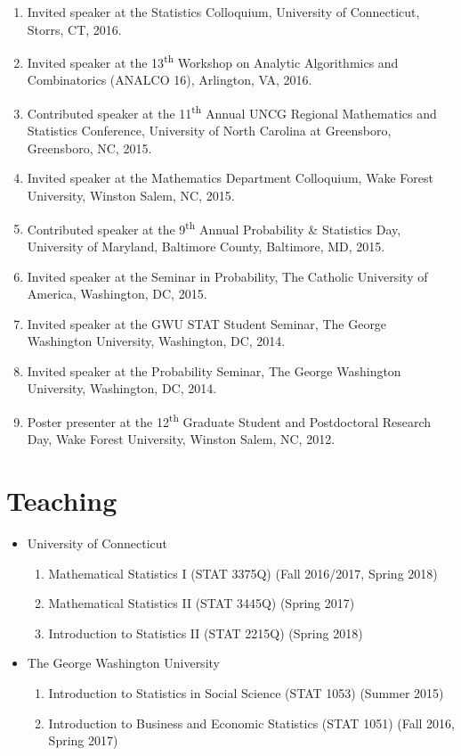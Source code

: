 \documentclass{res}
\begin{document}
\begin{resume}
\begin{enumerate}
	\item Invited speaker at the Statistics Colloquium, University of Connecticut, Storrs, CT, 2016.
	\item Invited speaker at the 13\textsuperscript{th} Workshop on Analytic Algorithmics and Combinatorics (ANALCO 16), Arlington, VA, 2016.
	\item Contributed speaker at the 11\textsuperscript{th} Annual UNCG Regional Mathematics and Statistics Conference, University of North Carolina at Greensboro, Greensboro, NC, 2015.
	\item Invited speaker at the Mathematics Department Colloquium, Wake Forest University, Winston Salem, NC, 2015. 
	\item Contributed speaker at the 9\textsuperscript{th} Annual Probability \& Statistics Day, University of Maryland, Baltimore County, Baltimore, MD, 2015.
	\item Invited speaker at the Seminar in Probability, The Catholic University of America, Washington, DC, 2015.
	\item Invited speaker at the GWU STAT Student Seminar, The George Washington University, Washington, DC, 2014.
	\item Invited speaker at the Probability Seminar, The George Washington University, Washington, DC, 2014.
	\item Poster presenter at the 12\textsuperscript{th} Graduate Student and Postdoctoral Research Day, Wake Forest University, Winston Salem, NC, 2012.
\end{enumerate}

\section{Teaching}
\begin{itemize}
	\item University of Connecticut
	\begin{enumerate}
		\item Mathematical Statistics {\rm I} (STAT 3375Q) (Fall 
		2016/2017, Spring 2018)
		\item Mathematical Statistics {\rm II} (STAT 3445Q) (Spring 
		2017)
		\item Introduction to Statistics {\rm II} (STAT 2215Q) 
		(Spring 2018)
	\end{enumerate}
	\item The George Washington University
	\begin{enumerate}
		\item Introduction to Statistics in Social Science (STAT 
		1053) (Summer 2015)
		\item Introduction to Business and Economic Statistics 
		(STAT 1051) (Fall 2016, Spring 2017)
	\end{enumerate}
\end{itemize}


\end{resume}
\end{document}
